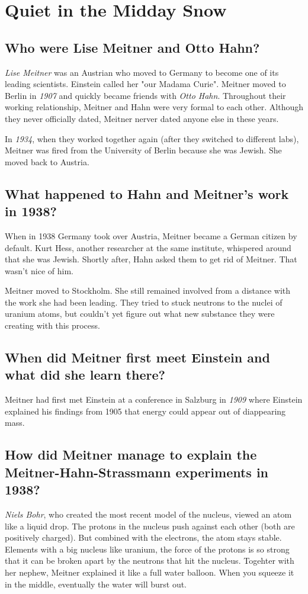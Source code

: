 %

\section{Quiet in the Midday Snow}

\subsection*{Who were Lise Meitner and Otto Hahn?}
\emph{Lise Meitner} was an Austrian who moved to Germany to become one of its leading scientists. Einstein called her "our Madama Curie".
Meitner moved to Berlin in \emph{1907} and quickly became friends with \emph{Otto Hahn}.
Throughout their working relationship, Meitner and Hahn were very formal to each other. Although they never officially dated, Meitner nerver dated anyone else in these years.

In \emph{1934}, when they worked together again (after they switched to different labs), Meitner was fired from the University of Berlin  because she was Jewish. She moved back to Austria.

\subsection*{What happened to Hahn and Meitner’s work in 1938?}
When in 1938 Germany took over Austria, Meitner became a German citizen by default. Kurt Hess, another researcher at the same institute, whispered around that she was Jewish. Shortly after, Hahn asked them to get rid of Meitner. That wasn't nice of him.

Meitner moved to Stockholm. She still remained involved from a distance with the work she had been leading. They tried to stuck neutrons to the nuclei of uranium atoms, but couldn't yet figure out what new substance they were creating with this process.

\subsection*{When did Meitner first meet Einstein and what did she learn there?}
Meitner had first met Einstein at a conference in Salzburg in \emph{1909} where Einstein explained his findings from 1905 that energy could appear out of diappearing mass.

\subsection*{How did Meitner manage to explain the Meitner-Hahn-Strassmann experiments in 1938?}
\emph{Niels Bohr}, who created the most recent model of the nucleus, viewed an atom like a liquid drop. The protons in the nucleus push against each other (both are positively charged). But combined with the electrons, the atom stays stable. Elements with a big nucleus like uranium, the force of the protons is so strong that it can be broken apart by the neutrons that hit the nucleus. Togehter with her nephew, Meitner explained it like a full water balloon. When you squeeze it in the middle, eventually the water will burst out.

